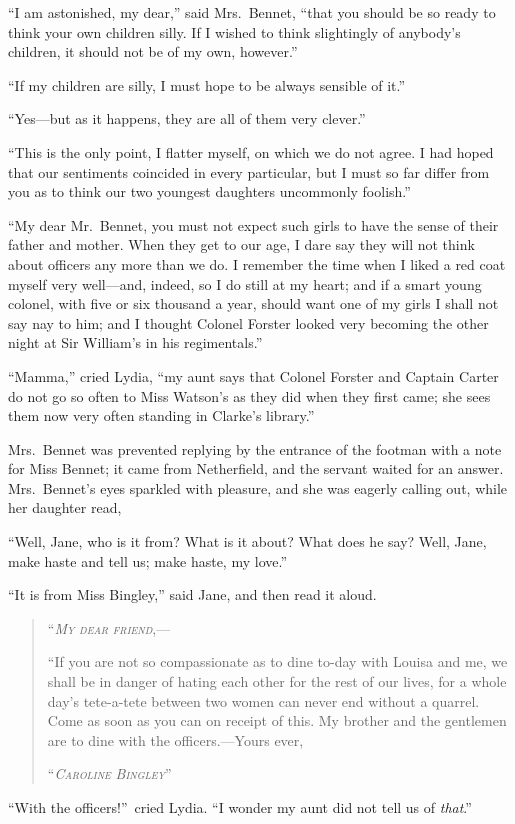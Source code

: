 \documentclass[12pt,english,oneside]{book}
\newcommand{\noun}[1]{\textsc{#1}}
\begin{document}
{}``I am astonished, my dear,'' said Mrs.\ Bennet, {}``that you
should be so ready to think your own children silly. If I wished to
think slightingly of anybody's children, it should not be of my own,
however.''

{}``If my children are silly, I must hope to be always sensible of
it.''

{}``Yes\mbox{---}but as it happens, they are all of them very clever.''

{}``This is the only point, I flatter myself, on which we do not
agree. I had hoped that our sentiments coincided in every particular,
but I must so far differ from you as to think our two youngest daughters
uncommonly foolish.''

{}``My dear Mr.\ Bennet, you must not expect such girls to have
the sense of their father and mother. When they get to our age, I
dare say they will not think about officers any more than we do. I
remember the time when I liked a red coat myself very well\mbox{---}and,
indeed, so I do still at my heart; and if a smart young colonel, with
five or six thousand a year, should want one of my girls I shall not
say nay to him; and I thought Colonel Forster looked very becoming
the other night at Sir William's in his regimentals.''

{}``Mamma,'' cried Lydia, {}``my aunt says that Colonel Forster
and Captain Carter do not go so often to Miss Watson's as they did
when they first came; she sees them now very often standing in Clarke's
library.''

Mrs.\ Bennet was prevented replying by the entrance of the footman
with a note for Miss Bennet; it came from Netherfield, and the servant
waited for an answer. Mrs.\ Bennet's eyes sparkled with pleasure,
and she was eagerly calling out, while her daughter read,

{}``Well, Jane, who is it from? What is it about? What does he say?
Well, Jane, make haste and tell us; make haste, my love.''

{}``It is from Miss Bingley,'' said Jane, and then read it aloud.

\begin{quotation}
\noindent {}``\textit{\emph{\noun{My}}} \textit{\emph{\noun{dear}}}
\textit{\emph{\noun{friend}}},\mbox{---}

{}``If you are not so compassionate as to dine to-day with Louisa
and me, we shall be in danger of hating each other for the rest of
our lives, for a whole day's tete-a-tete between two women can never
end without a quarrel. Come as soon as you can on receipt of this.
My brother and the gentlemen are to dine with the officers.\mbox{---}Yours
ever,

``\textit{\emph{\noun{Caroline}}} \textit{\emph{\noun{Bingley}}}'' 
\end{quotation}
{}``With the officers!''\ cried Lydia. {}``I wonder my aunt did
not tell us of \textit{that}.''
\end{document}
